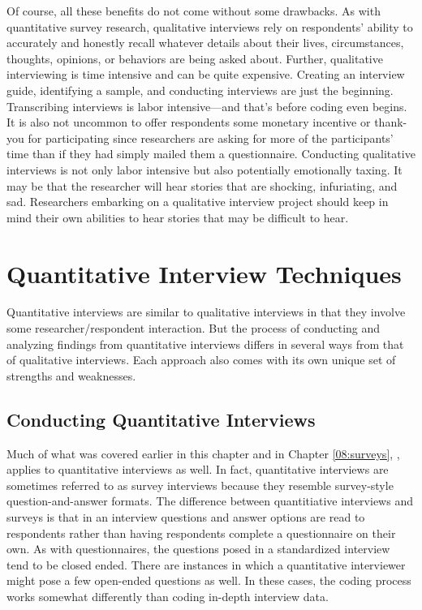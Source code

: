 Of course, all these benefits do not come without some drawbacks. As with quantitative survey research, qualitative interviews rely on respondents' ability to accurately and honestly recall whatever details about their lives, circumstances, thoughts, opinions, or behaviors are being asked about. Further, qualitative interviewing is time intensive and can be quite expensive. Creating an interview guide, identifying a sample, and conducting interviews are just the beginning. Transcribing interviews is labor intensive---and that's before coding even begins. It is also not uncommon to offer respondents some monetary incentive or thank-you for participating since researchers are asking for more of the participants' time than if they had simply mailed them a questionnaire. Conducting qualitative interviews is not only labor intensive but also potentially emotionally taxing. It may be that the researcher will hear stories that are shocking, infuriating, and sad.  Researchers embarking on a qualitative interview project should keep in mind their own abilities to hear stories that may be difficult to hear.

\section{Quantitative Interview Techniques}

Quantitative interviews are similar to qualitative interviews in that they involve some researcher/respondent interaction. But the process of conducting and analyzing findings from quantitative interviews differs in several ways from that of qualitative interviews. Each approach also comes with its own unique set of strengths and weaknesses.

\subsection{Conducting Quantitative Interviews}

Much of what was covered earlier in this chapter and in Chapter \ref{08:surveys}, , applies to quantitative interviews as well. In fact, quantitative interviews are sometimes referred to as survey interviews because they resemble survey-style question-and-answer formats. The difference between quantitiative interviews and surveys is that in an interview questions and answer options are read to respondents rather than having respondents complete a questionnaire on their own. As with questionnaires, the questions posed in a standardized interview tend to be closed ended. There are instances in which a quantitative interviewer might pose a few open-ended questions as well. In these cases, the coding process works somewhat differently than coding in-depth interview data.

